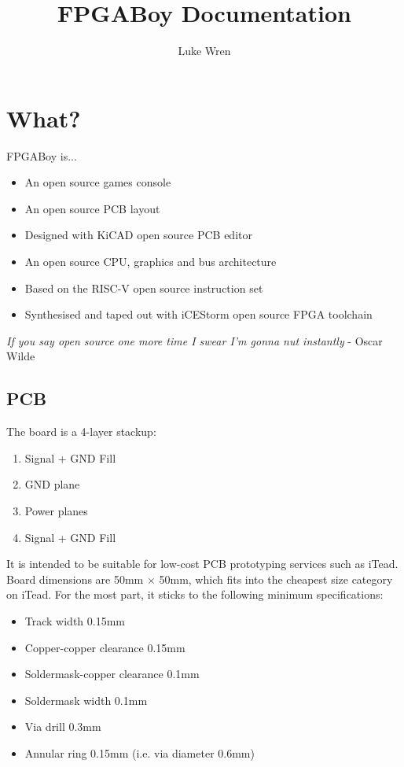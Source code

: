\documentclass{article}
\title{FPGABoy Documentation}
\author{Luke Wren}
\begin{document}
\maketitle
\tableofcontents
\newpage
{}

\section{What?}

FPGABoy is...
\begin{itemize}
\item An open source games console
\item An open source PCB layout
\item Designed with KiCAD open source PCB editor
\item An open source CPU, graphics and bus architecture
\item Based on the RISC-V open source instruction set
\item Synthesised and taped out with iCEStorm open source FPGA toolchain
\end{itemize}

\begin{displayquote}
\textit{If you say open source one more time I swear I'm gonna nut instantly} - Oscar Wilde
\end{displayquote}

\subsection{PCB}

The board is a 4-layer stackup:

\begin{enumerate}
\item Signal + GND Fill
\item GND plane
\item Power planes
\item Signal + GND Fill
\end{enumerate}

It is intended to be suitable for low-cost PCB prototyping services such as iTead. Board dimensions are 50mm $\times$ 50mm, which fits into the cheapest size category on iTead. For the most part, it sticks to the following minimum specifications:

\begin{itemize}
\item Track width 0.15mm
\item Copper-copper clearance 0.15mm
\item Soldermask-copper clearance 0.1mm
\item Soldermask width 0.1mm
\item Via drill 0.3mm
\item Annular ring 0.15mm (i.e. via diameter 0.6mm)
\end{itemize}
\end{document}
